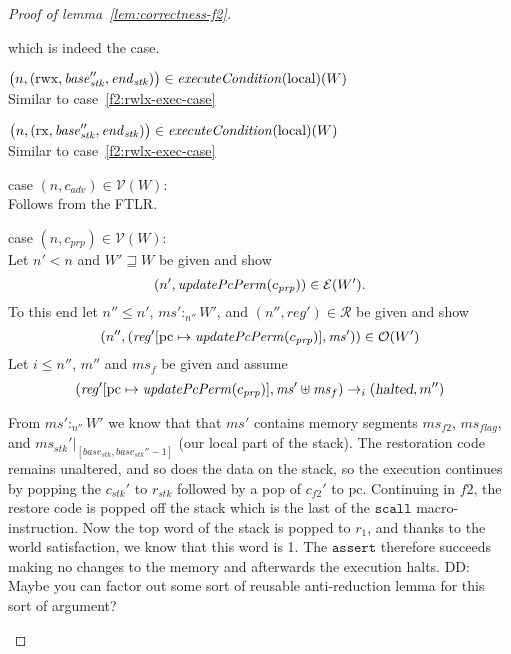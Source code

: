 \documentclass[a4paper]{article}
\newcommand{\update}[2]{[#1 \mapsto #2]}
\newcommand\dominique[1]{{\color{purple} \sf \footnotesize {DD: #1}}\\}
\newcommand{\var}[1]{\mathit{#1}}
\newcommand{\hs}{\var{ms}}
\newcommand{\ms}{\hs}
\newcommand{\pcreg}{\mathrm{pc}}
\newcommand{\start}{\var{base}}
\newcommand{\addrend}{\var{end}}
\newcommand{\reg}{\var{reg}}
\newcommand{\heap}{\var{mem}}
\newcommand{\adv}{\var{adv}}
\newcommand{\stk}{\var{stk}}
\newcommand{\flag}{\var{flag}}
\newcommand{\halted}{\textsl{halted}}
\newcommand{\plainfun}[2]{
  \ifthenelse{\equal{#2}{}}
  {\mathit{#1}}
  {\mathit{#1}(#2)}
}
\newcommand{\updatePcPerm}[1]{\plainfun{updatePcPerm}{#1}}
\newcommand{\execCond}[1]{\plainfun{executeCondition}{#1}}
\newcommand{\future}{\mathbin{\sqsupseteq}}
\newcommand{\heapSat}[3][\heap]{#1 :_{#2} #3}
\newcommand{\asmType}{\plaindom{AsmType}}
\newcommand{\plaindom}[1]{\mathrm{#1}}
\newcommand{\intr}[2]{\mathcal{#1}}
\newcommand{\valueintr}[1]{\intr{V}{#1}}
\newcommand{\exprintr}[1]{\intr{E}{#1}}
\newcommand{\regintr}[1]{\intr{R}{#1}}
\newcommand{\stdvr}{\valueintr{\asmType}}
\newcommand{\stder}{\exprintr{\asmType}}
\newcommand{\stdrr}{\regintr{\asmType}}
\newcommand{\observations}{\mathcal{O}}
\newcommand{\npair}[2][n]{\left(#1,#2 \right)}
\newcommand{\plainperm}[1]{\mathrm{#1}}
\newcommand{\exec}{\plainperm{rx}}
\newcommand{\rwx}{\plainperm{rwx}}
\newcommand{\local}{\plainperm{local}}
\newcommand{\step}[1][]{\rightarrow_{#1}}
\begin{document}
\begin{proof}[Proof of lemma~\ref{lem:correctness-f2}]
\begin{enumproof}[resume]
\begin{enumproof}
\begin{enumproof}
\begin{enumproof}
\[          \]
          which is indeed the case.
        \end{enumproof}
      \item $\npair{(\rwx,\start_\stk'', \addrend_\stk)} \in \execCond{}(\local)(W)$\\
        Similar to case~\ref{f2:rwlx-exec-case}
      \item $\npair{(\exec,\start_\stk'', \addrend_\stk)} \in \execCond{}(\local)(W)$\\
        Similar to case~\ref{f2:rwlx-exec-case}
      \end{enumproof}
    \item case $\npair{c_\adv} \in \stdvr(W)$:\\
      Follows from the FTLR.
    \item case $\npair{c_{\var{prp}}} \in \stdvr(W)$: \label{f2:c-prp}\\
      Let $n' < n$ and $W' \future W$ be given and show
      \[
        \npair[n']{\updatePcPerm{c_{\var{prp}}}} \in \stder(W').
      \]
      To this end let $n'' \leq n'$, $\heapSat[\ms']{n''}{W'}$, and $\npair[n'']{\reg'} \in \stdrr$ be given and show
      \[
        \npair[n'']{(\reg'\update{\pcreg}{\updatePcPerm{c_{\var{prp}}}},\ms')} \in \observations(W')
      \]
      Let $i \leq n''$, $m''$ and $\ms_f$ be given and assume
      \[
        (\reg'\update{\pcreg}{\updatePcPerm{c_{\var{prp}}}},\ms'\uplus\ms_f) \step[i]
        (\halted,m'')
      \]

      From $\heapSat[\ms']{n''}{W'}$ we know that that $\ms'$ contains memory segments $\hs_{f2}$, $\hs_\flag$, and $\ms_\stk'|_{[\start_\stk, \start_\stk''-1]}$ (our local part of the stack). The restoration code remains unaltered, and so does the data on the stack, so the execution continues by popping the $c_\stk'$ to $r_\stk$ followed by a pop of $c_{f2}'$ to $\pcreg$. Continuing in $f2$, the restore code is popped off the stack which is the last of the $\mathtt{scall}$ macro-instruction. Now the top word of the stack is popped to $r_1$, and thanks to the world satisfaction, we know that this word is 1. The $\mathtt{assert}$ therefore succeeds making no changes to the memory and afterwards the execution halts.
      \dominique{Maybe you can factor out some sort of reusable anti-reduction lemma
        for this sort of argument?}


\end{enumproof}
\end{enumproof}
\end{proof}
\end{document}
